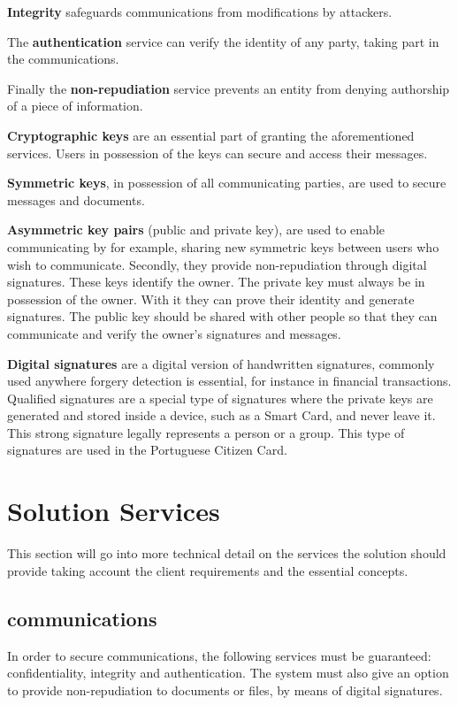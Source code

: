 \textbf{Integrity} safeguards communications from modifications by attackers.

The \textbf{authentication} service can verify the identity of any party, taking part in the communications.

Finally the \textbf{non-repudiation} service prevents an entity from denying authorship of a piece of information.

\textbf{Cryptographic keys} are an essential part of granting the aforementioned services. Users in possession of the keys can secure and access their messages.

\textbf{Symmetric keys}, in possession of all communicating parties, are used to secure messages and documents.

\textbf{Asymmetric key pairs} (public and private key), are used to enable communicating by for example, sharing new symmetric keys between users who wish to communicate. Secondly, they provide non-repudiation through digital signatures.
These keys identify the owner. The private key must always be in possession of the owner. With it they can prove their identity and generate signatures.
The public key should be shared with other people so that they can communicate and verify the owner's signatures and messages.

\textbf{Digital signatures} are a digital version of handwritten signatures, commonly used anywhere forgery detection is essential, for instance in financial transactions.
Qualified signatures are a special type of signatures where the private keys are generated and stored inside a device, such as a Smart Card, and never leave it.
This strong signature legally represents a person or a group. This type of signatures are used in the Portuguese Citizen Card.

\section{Solution Services} \label{chap:problem:services}


This section will go into more technical detail on the services the solution should provide taking account the client requirements and the essential concepts.

\subsection{communications} \label{chap:problem:services:comms}
In order to secure communications, the following services must be guaranteed: confidentiality, integrity and authentication.
The system must also give an option to provide non-repudiation to documents or files, by means of digital signatures.


